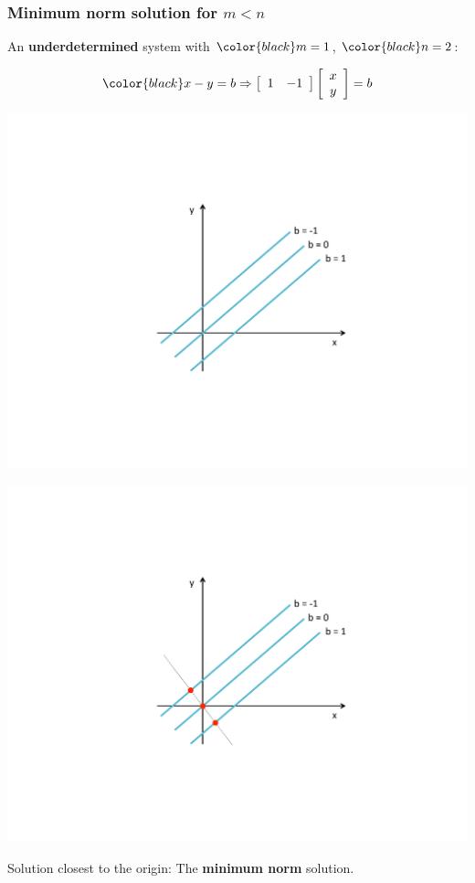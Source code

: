 \documentclass[compress]{beamer}
\newcommand{\black}[1]{{\color{black}#1}}
\renewcommand{\emph}[1]{\textbf{\black{#1}}}
\newcommand{\beq}[1]{\[\black{#1}\]}
\begin{document}

\begin{frame}[fragile]
\frametitle{Minimum norm solution for $m<n$}

An \emph{underdetermined} system with $\black{m=1}$, $\black{n=2}$:


\beq{
x - y = b \Rightarrow \left[\begin{array}{rr}
1 & -1\\
\end{array}
\right]
\left[ 
\begin{array}{c}
x\\
y
\end{array}
\right] = b
 }

\begin{overprint}
\begin{center}
\includegraphics[trim = 40mm 65mm 65mm 50mm, clip, width=.7\textwidth]{./img/min-norm-1}
\end{center}

\begin{center}
\includegraphics[trim = 40mm 65mm 65mm 50mm, clip, width=.7\textwidth]{./img/min-norm-2}
\end{center}
\vspace{.2cm}
Solution closest to the origin: The \emph{minimum norm} solution.
\end{overprint}

\end{frame}
\end{document}
